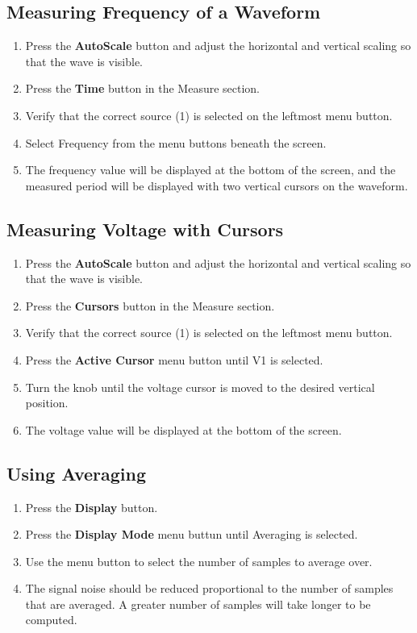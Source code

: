 \documentclass{article}
\begin{document}
\subsection{Measuring Frequency of a Waveform}
\begin{enumerate}
\item Press the \textbf{AutoScale} button and adjust the horizontal and vertical scaling so that the wave is visible.
\item Press the \textbf{Time} button in the Measure section.
\item Verify that the correct source (1) is selected on the leftmost menu button.
\item Select Frequency from the menu buttons beneath the screen.
\item The frequency value will be displayed at the bottom of the screen, and the measured period will be displayed with two vertical cursors on the waveform.
\end{enumerate}

\subsection{Measuring Voltage with Cursors}
\begin{enumerate}
\item Press the \textbf{AutoScale} button and adjust the horizontal and vertical scaling so that the wave is visible.
\item Press the \textbf{Cursors} button in the Measure section.
\item Verify that the correct source (1) is selected on the leftmost menu button.
\item Press the \textbf{Active Cursor} menu button until V1 is selected.
\item Turn the knob until the voltage cursor is moved to the desired vertical position.
\item The voltage value will be displayed at the bottom of the screen.
\end{enumerate}

\subsection{Using Averaging}
\begin{enumerate}
\item Press the \textbf{Display} button.
\item Press the \textbf{Display Mode} menu buttun until Averaging is selected.
\item Use the menu button to select the number of samples to average over.
\item The signal noise should be reduced proportional to the number of samples that are averaged. A greater number of samples will take longer to be computed.
\end{enumerate}
\end{document}
